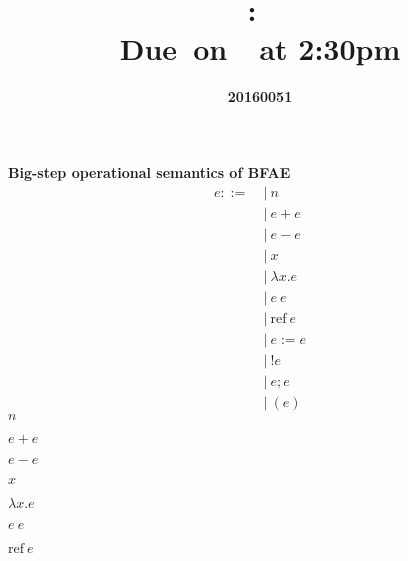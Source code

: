\documentclass{article}
\title{
    \vspace{2in}
    \textmd{\textbf{\hmwkClass:\ \hmwkTitle}}\\
    \normalsize\vspace{0.1in}\small{Due\ on\ \hmwkDueDate\ at 2:30pm}\\
    \vspace{0.1in}\large{\textit{\hmwkClassInstructor}}
    \vspace{3in}
}
\author{\textbf{20160051 \hmwkAuthorName}}
\date{}
\begin{document}
\textbf{\large{Big-step operational semantics of BFAE}}
\begin{align*}
    e::=&\ |\ n\\
    &\ |\ e+e\\
    &\ |\ e-e\\
    &\ |\ x\\
    &\ |\ \lambda x.e\\
    &\ |\ e\ e\\
    &\ |\ \mbox{ref}\ e\\
    &\ |\ e:=e\\
    &\ |\ !e\\
    &\ |\ e;e\\
    &\ |\ (e)
\end{align*}
$n$
\begin{prooftree}
\end{prooftree}
$e+e$
\begin{prooftree}
\end{prooftree}
$e-e$
\begin{prooftree}
\end{prooftree}
$x$
\begin{prooftree}
\end{prooftree}
$\lambda x.e$
\begin{prooftree}
\end{prooftree}
$e\ e$
\begin{prooftree}
\end{prooftree}
$\mbox{ref}\ e$
\begin{prooftree}
\end{prooftree}
\end{document}
